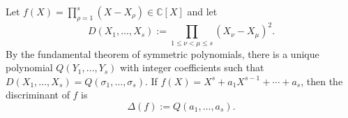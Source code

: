 Let $f(X) = \prod_{\rho=1}^{s} (X - X_\rho) \in \mathbb{C}[X]$ and let
$$D(X_1, \ldots, X_s) := \prod_{1 \leq \nu < \mu \leq s} (X_\nu - X_\mu)^2.$$
By the fundamental theorem of symmetric polynomials, there is a unique polynomial $Q(Y_1, \ldots, Y_s)$ with integer coefficients such that $D(X_1, \ldots, X_s) = Q(\sigma_1, \ldots, \sigma_s)$. If $f(X) = X^s + a_1 X^{s-1} + \cdots + a_s$, then the discriminant of $f$ is
$$\Delta(f) := Q(a_1, \ldots, a_s).$$
